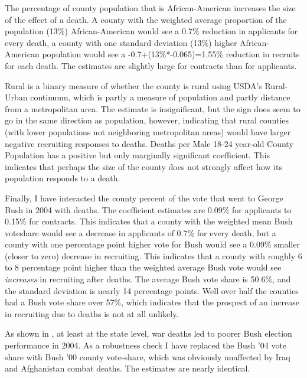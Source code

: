 \documentclass[12pt] {article}
\begin{document}
The percentage of county population that is African-American increases
the size of the effect of a death. A county with the weighted average
proportion of the population (13\%) African-American would see a 0.7\%
reduction in applicants for every death, a county with one standard deviation
(13\%) higher African-American population would see a -0.7+(13\%{*}-0.065)=1.55\%
reduction in recruits for each death. The estimates are slightly large for contracts than for applicants. %

Rural is a binary measure of whether the county is rural using USDA's Rural-Urban continuum, which is partly a measure of population and partly distance from a metropolitan area. The estimate is insignificant, but the sign does seem to go in the same direction as population, however, indicating that rural counties
(with lower populations not neighboring metropolitan areas) would have larger negative recruiting responses to deaths. Deaths per Male 18-24 year-old County Population has a positive but only marginally significant coefficient. This indicates that perhaps the size of the county does not strongly affect how its population responds to a death. %

Finally, I have interacted the county percent of the vote that went
to George Bush in 2004 with deaths. The coefficient estimates are 0.09\% for applicants to 0.15\% for contracts. This indicates that a county with the weighted mean Bush voteshare would see a decrease in applicants of 0.7\% for every death, but a county with one percentage point higher vote for Bush would see a 0.09\% smaller (closer
to zero) decrease in recruiting. This indicates that a county with
roughly 6 to 8 percentage point higher than the weighted average Bush
vote would see \textit{increases} in recruiting after deaths. The average Bush
vote share is 50.6\%, and the standard deviation is nearly 14 percentage
points. Well over half the counties had a Bush vote share over 57\%, which indicates that the prospect of an increase in recruiting due to deaths is not at all unlikely.

As shown in \cite{Ted-Miguel-Bush-Deaths}, at least at the state
level, war deaths led to poorer Bush election performance in 2004.
As a robustness check I have replaced the Bush '04 vote share with
Bush '00 county vote-share, which was obviously unaffected by Iraq
and Afghanistan combat deaths. The estimates are nearly identical. 
\end{document}
